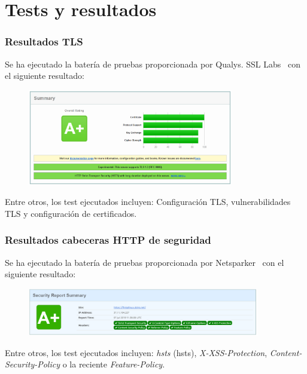 \section{Tests y resultados}
\begin{frame}[shrink]
  \frametitle{Resultados TLS}
  Se ha ejecutado la batería de pruebas proporcionada por Qualys. SSL Labs~\cite{ssllabs} con el siguiente resultado:
  \begin{figure}
    \centering
    \includegraphics[width=0.8\textwidth]{fig/SSLTLS_Report_Summary}
  \end{figure}
  Entre otros, los test ejecutados incluyen: Configuración TLS, vulnerabilidades TLS y configuración de certificados.
\end{frame}

\begin{frame}[shrink]
  \frametitle{Resultados cabeceras HTTP de seguridad}
  Se ha ejecutado la batería de pruebas proporcionada por Netsparker~\cite{securityheaders} con el siguiente resultado:
  \begin{figure}
    \centering
    \includegraphics[width=0.9\textwidth]{fig/SecurityHeaders_Report_Summary}
  \end{figure}
  Entre otros, los test ejecutados incluyen: {\em \acrlong{hsts}} (\acrshort{hsts}), {\em X-XSS-Protection}, {\em Content-Security-Policy} o la reciente {\em Feature-Policy}.
\end{frame}


